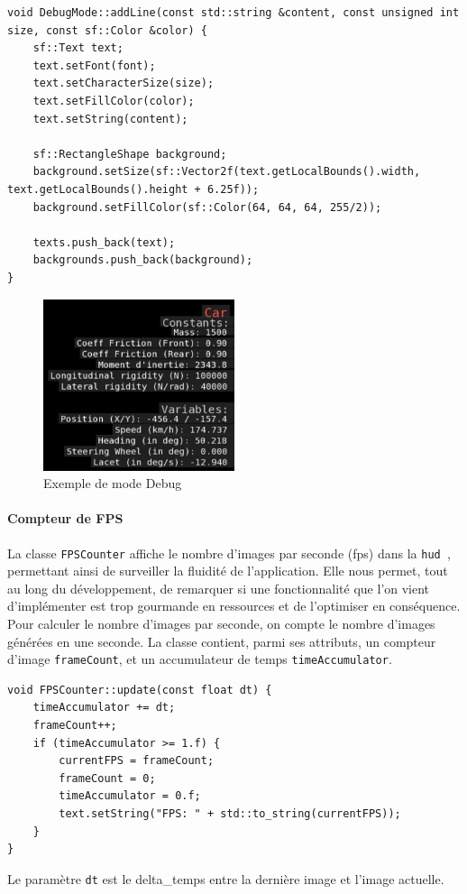 \begin{lstlisting}[style=CStyle, label={lst:code_addline}]
void DebugMode::addLine(const std::string &content, const unsigned int size, const sf::Color &color) {
    sf::Text text;
    text.setFont(font);
    text.setCharacterSize(size);
    text.setFillColor(color);
    text.setString(content);

    sf::RectangleShape background;
    background.setSize(sf::Vector2f(text.getLocalBounds().width, text.getLocalBounds().height + 6.25f));
    background.setFillColor(sf::Color(64, 64, 64, 255/2));

    texts.push_back(text);
    backgrounds.push_back(background);
}
\end{lstlisting}
\begin{figure}[H]
    \centering
    \includegraphics[width=0.5\textwidth]{resources/example_debug_mode_1}
    \caption{Exemple de mode Debug}
    \label{fig:debug_mode}
\end{figure}

\paragraph{Compteur de FPS}
La classe \texttt{FPSCounter} affiche le nombre d'images par seconde (\gls{fps}) dans la \texttt{\gls{hud} }, permettant ainsi de surveiller la fluidité de l'application.
Elle nous permet, tout au long du développement, de remarquer si une fonctionnalité que l'on vient d'implémenter est trop gourmande en ressources et de l'optimiser en conséquence.
\textsuper
Pour calculer le nombre d'images par seconde, on compte le nombre d'images générées en une seconde.
La classe contient, parmi ses attributs, un compteur d'image \texttt{frameCount}, et un accumulateur de temps \texttt{timeAccumulator}.
\begin{lstlisting}[style=CStyle, label={lst:code_fpscounter}]
void FPSCounter::update(const float dt) {
    timeAccumulator += dt;
    frameCount++;
    if (timeAccumulator >= 1.f) {
        currentFPS = frameCount;
        frameCount = 0;
        timeAccumulator = 0.f;
        text.setString("FPS: " + std::to_string(currentFPS));
    }
}
\end{lstlisting}
Le paramètre \texttt{dt} est le \gls{delta_temps} entre la dernière image et l'image actuelle.

